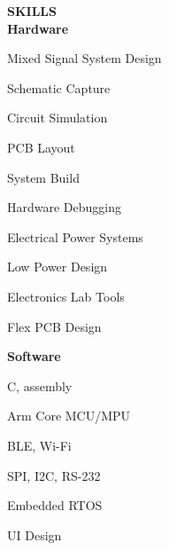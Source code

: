 \documentclass[10pt,letterpaper]{article}
\begin{document}
\vspace*{\fill}

{\noindent\sc\bf SKILLS}\vspace{.3pc}\\ 
{\indent\indent\sc\bf Hardware}
 \begin{multicols}{3}
\begin{itemize}[leftmargin=0.75in, rightmargin=0.25in, topsep=0in, itemindent=0in, label=\textrm{--}]
 {\small\sl
\item Mixed Signal System Design
\item Schematic Capture
\item Circuit Simulation
\item PCB Layout
\item System Build
\item Hardware Debugging
\item Electrical Power Systems
\item Low Power Design
\item Electronics Lab Tools
\item Flex PCB Design


}
\end{itemize}
\end{multicols}
{\indent\indent\sc\bf Software}
 \begin{multicols}{3}
 \begin{itemize}[leftmargin=0.75in, rightmargin=0.25in, topsep=0mm,itemindent=0mm, label=\textrm{--}]
  {\small\sl
\item  C, assembly
\item Arm Core MCU/MPU
\item BLE, Wi-Fi
\item SPI, I2C, RS-232
\item Embedded RTOS
\item UI Design
}
\end{itemize}
\end{multicols}
\end{document}

